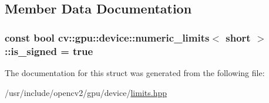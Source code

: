 \subsection{Member Data Documentation}
\hypertarget{structcv_1_1gpu_1_1device_1_1numeric__limits_3_01short_01_4_a694bef16b8e6ac3cd83c330387aedbe2}{
\subsubsection[{is\-\_\-signed}]{\setlength{\rightskip}{0pt plus 5cm}const bool {\bf cv\-::gpu\-::device\-::numeric\-\_\-limits}$<$ short $>$\-::is\-\_\-signed = {\bf true}\hspace{0.3cm}{\ttfamily [static]}}}\label{structcv_1_1gpu_1_1device_1_1numeric__limits_3_01short_01_4_a694bef16b8e6ac3cd83c330387aedbe2}


The documentation for this struct was generated from the following file\-:\begin{DoxyCompactItemize}
\item 
/usr/include/opencv2/gpu/device/\hyperlink{limits_8hpp}{limits.\-hpp}\end{DoxyCompactItemize}
